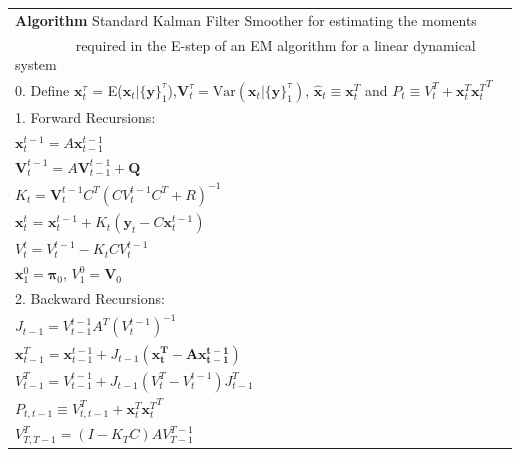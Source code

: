 \documentclass[fleqn]{article}
\newcommand{\T}{T}
\begin{document}
\begin{tabular}{l}
\hline
\textbf{Algorithm } Standard Kalman Filter Smoother for estimating the moments \\
$\qquad\quad\quad$ required in the E-step of an EM algorithm for a linear dynamical system\\
\hline
0. Define $\mathbf{x}_t^{\tau}$ = E($\mathbf{x}_t|\{\mathbf{y}\}_1^{\tau}$),$\mathbf{V}_t^{\tau}=\text{Var}(\mathbf{x}_t|\{\mathbf{y}\}_1^{\tau})$, $\hat{\mathbf{x}}_t \equiv \mathbf{x}_t^T$ and $P_t\equiv V_t^T+\mathbf{x}_t^T{\mathbf{x}_t^T}^{\T}$\\
1. Forward Recursions:\\
\hspace{4 mm} $\mathbf{x}_t^{t-1}=A\mathbf{x}_{t-1}^{t-1}$\\
\hspace{4 mm} $\mathbf{V}_t^{t-1}=A\mathbf{V}_{t-1}^{t-1}+\mathbf{Q}$\\
\hspace{4 mm} $K_t=\mathbf{V}_t^{t-1}C^{\T}(CV_t^{t-1}C^{\T}+R)^{-1}$\\
\hspace{4 mm} $\mathbf{x}_t^t$ = $\mathbf{x}_t^{t-1} + K_t (\mathbf{y}_t - C\mathbf{x}_t^{t-1})$\\
\hspace{4 mm} $V_t^t=V_t^{t-1}-K_tCV_t^{t-1}$\\
\hspace{4 mm} $\mathbf{x}_1^0=\mathbf{\pi}_0$, $V_1^0=\mathbf{V}_0$\\
2. Backward Recursions:\\
\hspace{4 mm} $J_{t-1} = V_{t-1}^{t-1}A^{\T}(V_t^{t-1})^{-1}$\\
\hspace{4 mm} $\mathbf{x}_{t-1}^T=\mathbf{x}_{t-1}^{t-1}+J_{t-1}(\mathbf{x_t^T-A\mathbf{x}_{t-1}^{t-1}})$\\
\hspace{4 mm} $V_{t-1}^T = V_{t-1}^{t-1}+J_{t-1}(V_t^T-V_t^{t-1})J_{t-1}^{\T}$\\
\hspace{4 mm} $P_{t,t-1}\equiv V_{t,t-1}^T+\mathbf{x}_t^T{\mathbf{x}_t^T}^{\T}$\\
\hspace{4 mm} $V_{T,T-1}^T=(I-K_TC)AV_{T-1}^{T-1}$\\
\hline
\end{tabular}

\newpage
\end{document}
